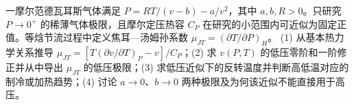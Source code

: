 一摩尔范德瓦耳斯气体满足 \(P=RT/(v-b)-a/v^2\)，其中 \(a,b,R>0\)。只研究 \(P\to0^+\) 的稀薄气体极限，且摩尔定压热容 \(C_P\) 在研究的小范围内可近似为固定正值。等焓节流过程中定义焦耳—汤姆孙系数 \(\mu_{JT}=(\partial T/\partial P)_H\)。
(1) 从基本热力学关系推导 \(\mu_{JT}=[T(\partial v/\partial T)_P-v]/C_P\)；(2) 求 \(v(P,T)\) 的低压零阶和一阶修正并从中导出 \(\mu_{JT}\) 的低压极限；(3) 求低压近似下的反转温度并判断高低温对应的制冷或加热趋势；(4) 讨论 \(a\to0\)、\(b\to0\) 两种极限及为何该近似不能直接用于高压。
